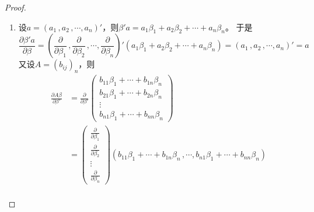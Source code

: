 \documentclass[10pt]{article}
\theoremstyle{definition}
\theoremstyle{definition}
\begin{document}
\begin{enumerate}
        \begin{proof}
            \begin{enumerate}[label=(\roman*)]
                \item
                    设$a=(a_1\, ,a_2\, ,\cdots ,a_n)'$，则$\beta'a=a_1\beta_1+a_2\beta_2+\cdots +a_n\beta_n$。
                    于是
                    \begin{equation*}
                        \frac{\partial \beta' a}{\partial \beta}
                        =\left(\frac{\partial}{\partial \beta_1}\, ,\frac{\partial}{\partial \beta_2}\, ,\cdots ,\frac{\partial}{\partial \beta_n}\right)'(a_1\beta_1+a_2\beta_2+\cdots +a_n\beta_n)
                        =(a_1\, ,a_2\, ,\cdots ,a_n)'
                        =a
                    \end{equation*}
                    又设$A=(b_{ij})_n$，则 \begin{equation*}
                        \begin{aligned}
                            \frac{\partial A\beta}{\partial \beta'} & = \frac{\partial}{\partial \beta'}
                            \begin{pmatrix}
                                b_{11}\beta_1+\cdots +b_{1n}\beta_n \\
                                b_{21}\beta_1+\cdots +b_{2n}\beta_n \\
                                \vdots \\
                                b_{n1}\beta_1+\cdots +b_{nn}\beta_n 
                            \end{pmatrix}\\
                                                                    & = 
                                                                    \begin{pmatrix}
                                                                        \frac{\partial}{\partial \beta_1} \\
                                                                        \frac{\partial}{\partial \beta_2} \\
                                                                        \vdots \\
                                                                        \frac{\partial}{\partial \beta_n}
                                                                    \end{pmatrix} (b_{11}\beta_1+\cdots +b_{1n}\beta_n\, ,\cdots , b_{n1}\beta_1+\cdots +b_{nn}\beta_n ) \\

\end{aligned}
\end{equation*}
\end{enumerate}
\end{proof}
\end{enumerate}
\end{document}
